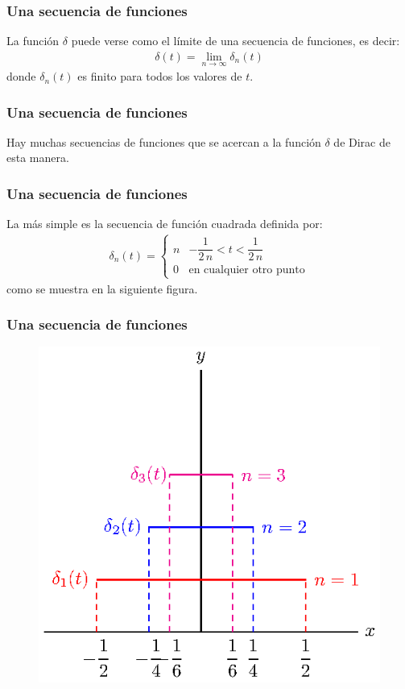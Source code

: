 \documentclass[12pt]{beamer}
\begin{document}
\begin{frame}
\frametitle{Una secuencia de funciones}
La función $\delta$ puede verse como el límite de una secuencia de funciones, es decir:
\pause
\begin{align*}
\delta(t) = \lim_{n \to \infty} \delta_{n} (t)
\end{align*}
donde $\delta_{n}(t)$ es finito para todos los valores de $t$.
\end{frame}
\begin{frame}
\frametitle{Una secuencia de funciones}
Hay muchas secuencias de funciones que se acercan a la función $\delta$ de Dirac de esta manera.
\end{frame}
\begin{frame}
\frametitle{Una secuencia de funciones}
La más simple es la secuencia de función cuadrada definida por:
\pause
\begin{align*}
\delta_{n} (t) = \begin{cases}
n & -\dfrac{1}{2 \, n} < t < \dfrac{1}{2 \, n} \\
0 & \mbox{en cualquier otro punto}
\end{cases}
\end{align*}
como se muestra en la siguiente figura.%
\end{frame}
\begin{frame}
\frametitle{Una secuencia de funciones}
\begin{figure}[H]
    \centering
    \includegraphics[scale=1]{Imagenes/plot_secuencia_delta_02.eps}
\end{figure}
\end{frame}
\end{document}
